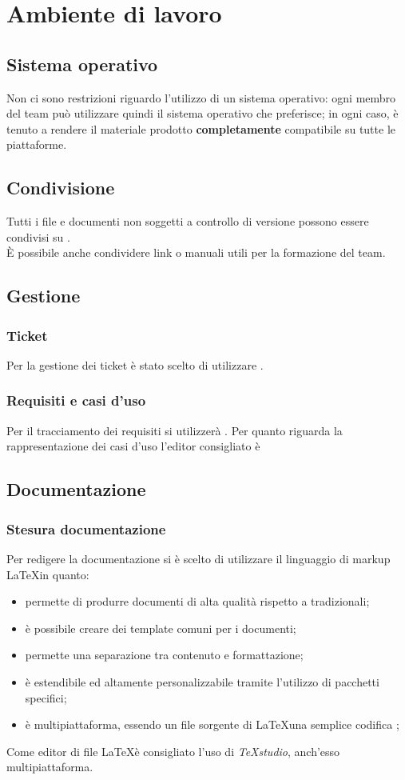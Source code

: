 \section{Ambiente di lavoro}
	\subsection{Sistema operativo}
	Non ci sono restrizioni riguardo l'utilizzo di un sistema operativo: ogni membro del team può utilizzare quindi il sistema operativo che preferisce; in ogni caso, è tenuto a rendere il materiale prodotto \textbf{completamente} compatibile su tutte le piattaforme.
	\subsection{Condivisione}
	Tutti i file e documenti non soggetti a controllo di versione possono essere condivisi su . \\
	È possibile anche condividere link o manuali utili per la formazione del team.
	\subsection{Gestione}
		\subsubsection{Ticket}
		Per la gestione dei ticket è stato scelto di utilizzare . %
		\subsubsection{Requisiti e casi d'uso}
		Per il tracciamento dei requisiti si utilizzerà . Per quanto riguarda la rappresentazione dei casi d'uso l'editor consigliato è  %
	\subsection{Documentazione}
		\subsubsection{Stesura documentazione}
		Per redigere la documentazione si è scelto di utilizzare il linguaggio di markup \LaTeX in quanto: \\
		\begin{itemize} 
			\item permette di produrre documenti di alta qualità rispetto a  tradizionali; 
			\item è possibile creare dei template comuni per i documenti;
			\item permette una separazione tra contenuto e formattazione;
			\item è estendibile ed altamente personalizzabile tramite l'utilizzo di pacchetti specifici;
			\item è multipiattaforma, essendo un file sorgente di \LaTeX una semplice codifica ;
		\end{itemize}
		Come editor di file \LaTeX è consigliato l'uso di \textit{TeXstudio}, anch'esso multipiattaforma.
